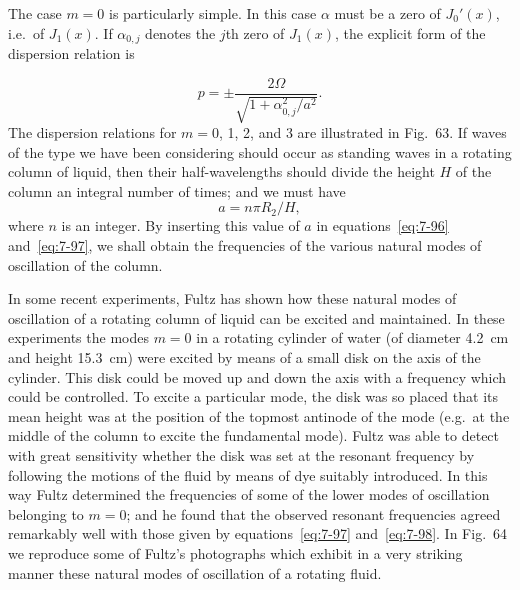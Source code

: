 The case $m = 0$ is particularly simple.  In this case $\alpha$ must be a zero
of $J_0'(x)$, i.e.\ of $J_1(x)$.  If $\alpha_{0,j}$ denotes the $j$th zero of $J_1(x)$, the explicit
form of the dispersion relation is


\begin{equation}
\label{eq:7-97}
p = \pm\frac{2\Omega}{\sqrt{1+\alpha_{0,j}^2/a^2}}.
\end{equation}
The dispersion relations for $m = 0$, 1, 2, and 3 are illustrated in Fig.~63.
If waves of the type we have been considering should occur as standing
waves in a rotating column of liquid, then their half-wavelengths should
divide the height $H$ of the column an integral number of times; and we
must have
\begin{equation}
\label{eq:7-98}
a = n\pi R_2/H,
\end{equation}
where $n$ is an integer.  By inserting this value of $a$ in equations~\eqref{eq:7-96} and~\eqref{eq:7-97}, we shall obtain the frequencies of the various natural modes of
oscillation of the column.

In some recent experiments, Fultz has shown how these natural modes
of oscillation of a rotating column of liquid can be excited and maintained.  In these experiments the modes $m = 0$ in a rotating cylinder of
water (of diameter 4.2~cm and height 15.3~cm) were excited by means of
a small disk on the axis of the cylinder.  This disk could be moved up
and down the axis with a frequency which could be controlled.  To excite
a particular mode, the disk was so placed that its mean height was at the
position of the topmost antinode of the mode (e.g.\ at the middle of the
column to excite the fundamental mode).  Fultz was able to detect with
great sensitivity whether the disk was set at the resonant frequency by
following the motions of the fluid by means of dye suitably introduced.
In this way Fultz determined the frequencies of some of the lower modes
of oscillation belonging to $m = 0$; and he found that the observed
resonant frequencies agreed remarkably well with those given by
equations~\eqref{eq:7-97} and~\eqref{eq:7-98}.  In Fig.~64 we reproduce some of Fultz's photographs which exhibit in a very striking manner these natural modes of
oscillation of a rotating fluid.


